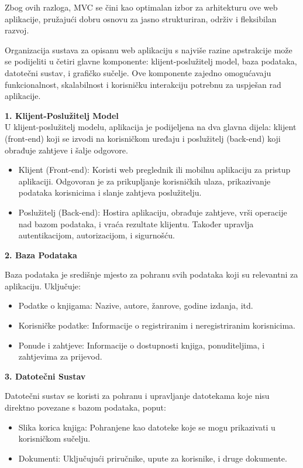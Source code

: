 Zbog ovih razloga, MVC se čini kao optimalan izbor za arhitekturu ove web aplikacije, pružajući dobru osnovu za jasno strukturiran, održiv i fleksibilan razvoj.


Organizacija sustava za opisanu web aplikaciju s najviše razine apstrakcije može se podijeliti u četiri glavne komponente: klijent-poslužitelj model, baza podataka, datotečni sustav, i grafičko sučelje. Ove komponente zajedno omogućavaju funkcionalnost, skalabilnost i korisničku interakciju potrebnu za uspješan rad aplikacije.

	\eject

 \textbf{1. Klijent-Poslužitelj Model} \\

U klijent-poslužitelj modelu, aplikacija je podijeljena na dva glavna dijela: klijent (front-end) koji se izvodi na korisničkom uređaju i poslužitelj (back-end) koji obrađuje zahtjeve i šalje odgovore.
\begin{itemize}
		  \item {Klijent (Front-end): Koristi web preglednik ili mobilnu aplikaciju za pristup aplikaciji. Odgovoran je za prikupljanje korisničkih ulaza, prikazivanje podataka korisnicima i slanje zahtjeva poslužitelju.}
		  \item {Poslužitelj (Back-end): Hostira aplikaciju, obrađuje zahtjeve, vrši operacije nad bazom podataka, i vraća rezultate klijentu. Također upravlja autentikacijom, autorizacijom, i sigurnošću.}	\\
	   \end{itemize}
	   


 \textbf{2. Baza Podataka}

Baza podataka je središnje mjesto za pohranu svih podataka koji su relevantni za aplikaciju. Uključuje:
\begin{itemize}
		  \item {Podatke o knjigama: Nazive, autore, žanrove, godine izdanja, itd.}
		  \item {Korisničke podatke: Informacije o registriranim i neregistriranim korisnicima.}	
            \item {Ponude i zahtjeve: Informacije o dostupnosti knjiga, ponuditeljima, i zahtjevima za prijevod.} \\
	   \end{itemize} 


 \textbf{3. Datotečni Sustav}

Datotečni sustav se koristi za pohranu i upravljanje datotekama koje nisu direktno povezane s bazom podataka, poput:
\begin{itemize}
		  \item {Slika korica knjiga: Pohranjene kao datoteke koje se mogu prikazivati u korisničkom sučelju.}
		  \item {Dokumenti: Uključujući priručnike, upute za korisnike, i druge dokumente.} \\
	   \end{itemize} 

